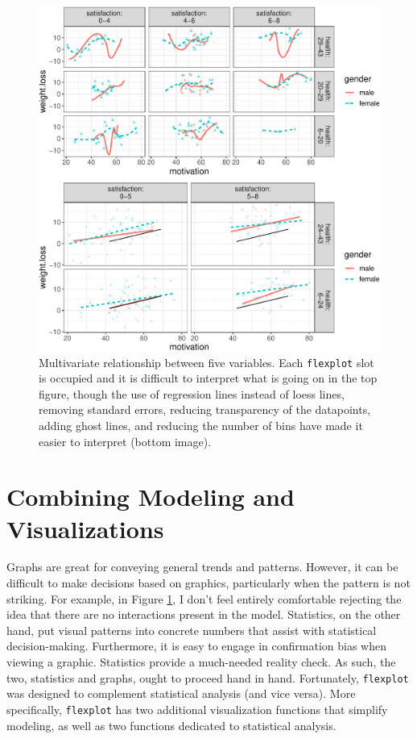 \documentclass[
  english,
  man]{apa6}
\begin{document}
\begin{figure}
\centering
\includegraphics{flexplot_psychmeth_files/figure-latex/threeway-1.pdf}
\caption{\label{fig:threeway}Multivariate relationship between five variables. Each \texttt{flexplot} slot is occupied and it is difficult to interpret what is going on in the top figure, though the use of regression lines instead of loess lines, removing standard errors, reducing transparency of the datapoints, adding ghost lines, and reducing the number of bins have made it easier to interpret (bottom image). \label{fig:threeway}}
\end{figure}

\normalsize

\hypertarget{combining-modeling-and-visualizations}{%
\section{Combining Modeling and Visualizations}\label{combining-modeling-and-visualizations}}

Graphs are great for conveying general trends and patterns. However, it can be difficult to make decisions based on graphics, particularly when the pattern is not striking. For example, in Figure \ref{fig:threeway}, I don't feel entirely comfortable rejecting the idea that there are no interactions present in the model. Statistics, on the other hand, put visual patterns into concrete numbers that assist with statistical decision-making. Furthermore, it is easy to engage in confirmation bias when viewing a graphic. Statistics provide a much-needed reality check. As such, the two, statistics and graphs, ought to proceed hand in hand. Fortunately, \texttt{flexplot} was designed to complement statistical analysis (and vice versa). More specifically, \texttt{flexplot} has two additional visualization functions that simplify modeling, as well as two functions dedicated to statistical analysis.
\end{document}
